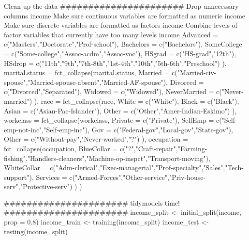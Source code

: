 \documentclass{article}
\begin{document}
Clean up the data
######################
Drop unnecessary columns
income %
Make sure continuous variables are formatted as numeric
income %
Make sure discrete variables are formatted as factors
income %
Combine levels of factor variables that currently have too many levels
income %
                                            Advanced    = c("Masters","Doctorate","Prof-school"), 
                                            Bachelors   = c("Bachelors"), 
                                            SomeCollege = c("Some-college","Assoc-acdm","Assoc-voc"),
                                            HSgrad      = c("HS-grad","12th"),
                                            HSdrop      = c("11th","9th","7th-8th","1st-4th","10th","5th-6th","Preschool") 
),
marital.status = fct_collapse(marital.status,
                              Married      = c("Married-civ-spouse","Married-spouse-absent","Married-AF-spouse"), 
                              Divorced     = c("Divorced","Separated"), 
                              Widowed      = c("Widowed"), 
                              NeverMarried = c("Never-married")
), 
race = fct_collapse(race,
                    White = c("White"), 
                    Black = c("Black"), 
                    Asian = c("Asian-Pac-Islander"), 
                    Other = c("Other","Amer-Indian-Eskimo")
), 
workclass = fct_collapse(workclass,
                         Private = c("Private"), 
                         SelfEmp = c("Self-emp-not-inc","Self-emp-inc"), 
                         Gov     = c("Federal-gov","Local-gov","State-gov"), 
                         Other   = c("Without-pay","Never-worked","?")
), 
occupation = fct_collapse(occupation,
                          BlueCollar  = c("?","Craft-repair","Farming-fishing","Handlers-cleaners","Machine-op-inspct","Transport-moving"), 
                          WhiteCollar = c("Adm-clerical","Exec-managerial","Prof-specialty","Sales","Tech-support"), 
                          Services    = c("Armed-Forces","Other-service","Priv-house-serv","Protective-serv")
)
)


######################
tidymodels time!
######################
income_split <- initial_split(income, prop = 0.8)
income_train <- training(income_split)
income_test  <- testing(income_split)
\end{document}
